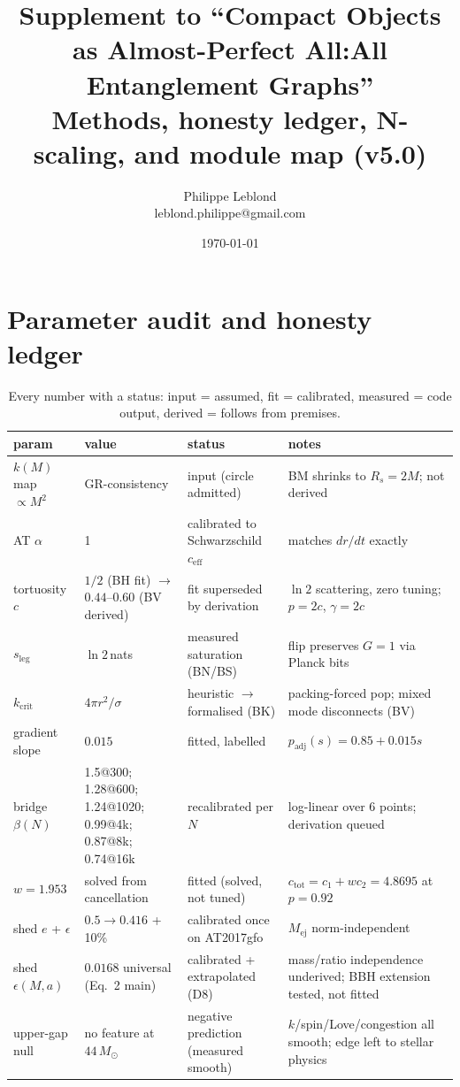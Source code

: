 \documentclass[11pt]{article}
\title{Supplement to ``Compact Objects as Almost-Perfect All:All Entanglement Graphs''\\
\large Methods, honesty ledger, N-scaling, and module map (v5.0)}
\author{Philippe Leblond \\ \small leblond.philippe@gmail.com}
\date{\today}
\begin{document}
\maketitle
\tableofcontents

\section{Parameter audit and honesty ledger}
\label{sec:audit}

\begin{table}[ht]\centering\scriptsize\renewcommand{\arraystretch}{0.84}
\caption{Every number with a status: input = assumed, fit = calibrated, measured = code output, derived = follows from premises.}
\begin{tabular}{@{}p{3.4cm} p{3.4cm} p{2.6cm} p{4.4cm}@{}}\toprule
param & value & status & notes \\\midrule
$k(M)$ map $\propto M^2$ & GR-consistency & input (circle admitted) & BM shrinks to $R_s = 2M$; not derived \\
AT $\alpha$ & 1 & calibrated to Schwarzschild $c_{\mathrm{eff}}$ & matches $dr/dt$ exactly \\
tortuosity $c$ & $1/2$ (BH fit) $\to$ $0.44$--$0.60$ (BV derived) & fit superseded by derivation & $\ln 2$ scattering, zero tuning; $p = 2c$, $\gamma = 2c$ \\
$s_{\mathrm{leg}}$ & $\ln 2$\,nats & measured saturation (BN/BS) & flip preserves $G = 1$ via Planck bits \\
$k_{\mathrm{crit}}$ & $4\pi r^2/\sigma$ & heuristic $\to$ formalised (BK) & packing-forced pop; mixed mode disconnects (BV) \\
gradient slope & $0.015$ & fitted, labelled & $p_{\mathrm{adj}}(s) = 0.85+0.015s$ \\
bridge $\beta(N)$ & 1.5@300; 1.28@600; 1.24@1020; 0.99@4k; 0.87@8k; 0.74@16k & recalibrated per $N$ & log-linear over 6 points; derivation queued \\
$w = 1.953$ & solved from cancellation & fitted (solved, not tuned) & $c_{\mathrm{tot}} = c_1 + w c_2 = 4.8695$ at $p = 0.92$ \\
shed $e$ + $\epsilon$ & $0.5\to0.416$ + 10\% & calibrated once on AT2017gfo & $M_{\mathrm{ej}}$ norm-independent \\
shed $\epsilon(M,a)$ & $0.0168$ universal (Eq.~2 main) & calibrated + extrapolated (D8) & mass/ratio independence underived; BBH extension tested, not fitted \\
upper-gap null & no feature at $44\,M_\odot$ & negative prediction (measured smooth) & $k$/spin/Love/congestion all smooth; edge left to stellar physics \\

\end{tabular}
\end{table}
\end{document}

